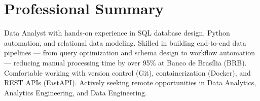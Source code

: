 \justifying
\section{Professional Summary}
Data Analyst with hands-on experience in SQL database design, Python automation, and relational data modeling. Skilled in building end-to-end data pipelines --- from query optimization and schema design to workflow automation --- reducing manual processing time by over 95\% at Banco de Brasília (BRB). Comfortable working with version control (Git), containerization (Docker), and REST APIs (FastAPI). Actively seeking remote opportunities in Data Analytics, Analytics Engineering, and Data Engineering.